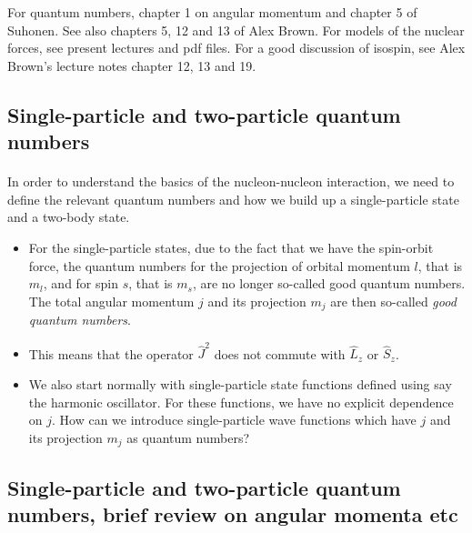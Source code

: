 \documentclass[%
twoside,                 %
final,                   %
10pt]{article}
\begin{document}
\noindent
For quantum numbers, chapter 1 on angular momentum and chapter 5 of Suhonen.
See also chapters 5, 12 and 13 of Alex Brown. For models of the nuclear forces, see present lectures and pdf files.
For a good discussion of isospin, see Alex Brown's lecture notes chapter 12, 13 and 19.





\subsection*{Single-particle and two-particle quantum numbers}

\paragraph{}
In order to understand the basics of the nucleon-nucleon interaction, we need to define the relevant quantum numbers and how we build up a single-particle state and a two-body state. 

\begin{itemize}
\item For the single-particle states, due to the fact that we have the spin-orbit force, the quantum numbers for the projection of orbital momentum $l$, that is $m_l$, and for spin $s$, that is $m_s$, are no longer so-called good quantum numbers. The total angular momentum $j$ and its projection $m_j$ are then  so-called \emph{good quantum numbers}.

\item This means that the operator $\hat{J}^2$ does not commute with $\hat{L}_z$  or $\hat{S}_z$.  

\item We also start normally with single-particle state functions defined using say the harmonic oscillator. For these functions, we have no explicit dependence on $j$. How can we introduce single-particle wave functions which have $j$ and its projection $m_j$ as quantum numbers? 
\end{itemize}

\noindent




\subsection*{Single-particle and two-particle quantum numbers, brief review on angular momenta etc}
\end{document}

